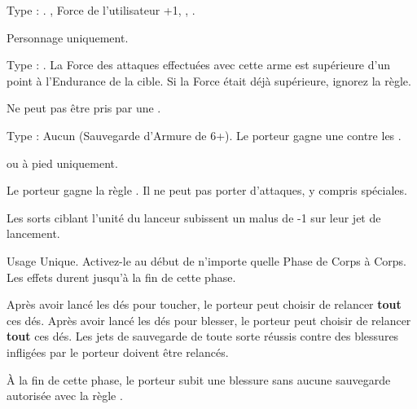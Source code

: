 \armymagicalweapons

\startpricelist

Type : \longbow{}. , Force de l'utilisateur +1, , .


Personnage uniquement.

Type : \spear{}. La Force des attaques effectuées avec cette arme est supérieure d'un point à l'Endurance de la cible. Si la Force était déjà supérieure, ignorez la règle.

\endpricelist

\armymagicalarmour

\startpricelist

Ne peut pas être pris par une \largetarget{}.

Type : Aucun (Sauvegarde d'Armure de 6+). Le porteur gagne une  contre les \magicalattacks{}.

\endpricelist

\armytalismans

\startpricelist

\archmage{} ou \mage{} à pied uniquement.

Le porteur gagne la règle \ethereal{}. Il ne peut pas porter d'attaques, y compris spéciales.

\endpricelist

\armyenchanteditems

\startpricelist

Les sorts ciblant l'unité du lanceur subissent un malus de -1 sur leur jet de lancement.

Usage Unique. Activez-le au début de n'importe quelle Phase de Corps à Corps. Les effets durent jusqu'à la fin de cette phase.

Après avoir lancé les dés pour toucher, le porteur peut choisir de relancer \textbf{tout} ces dés. Après avoir lancé les dés pour blesser, le porteur peut choisir de relancer \textbf{tout} ces dés. Les jets de sauvegarde de toute sorte réussis contre des blessures infligées par le porteur doivent être relancés.

À la fin de cette phase, le porteur subit une blessure sans aucune sauvegarde autorisée avec la règle .

\endpricelist

